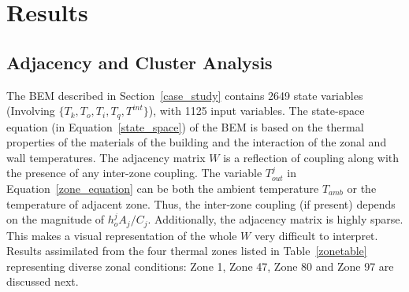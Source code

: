 \section{Results}
\label{results}
\subsection{Adjacency and Cluster Analysis}
\label{adjacency}

The BEM described in Section~\ref{case_study} contains 2649 state variables (Involving $\lbrace T_k,T_o,T_i,T_q,T^{int} \rbrace$), with 1125 input variables. The state-space equation (in Equation~\ref{state_space}) of the BEM is based on the thermal properties of the materials of the building and the interaction of the zonal and wall temperatures. The adjacency matrix $W$ is a reflection of coupling along with the presence of any inter-zone coupling. The variable $T_{out}^j$ in Equation~\ref{zone_equation} can be both the ambient temperature $T_{amb}$ or the temperature of adjacent zone. Thus, the inter-zone coupling (if present) depends on the magnitude of $h^j_o A_j/C_j$. Additionally, the adjacency matrix is highly sparse. This makes a visual representation of the whole $W$ very difficult to interpret. Results assimilated from the four thermal zones listed in Table~\ref{zonetable} representing diverse zonal conditions: Zone 1, Zone 47, Zone 80 and Zone 97 are discussed next.   

